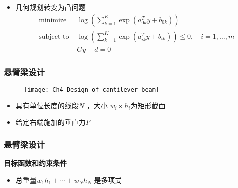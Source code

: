 \documentclass[handout]{beamer}
\begin{document}
\begin{frame}
\begin{frame}
\begin{itemize}[<+->]
			\item 几何规划转变为凸问题
			\begin{equation}
				\begin{array}{ll}
					\text { minimize } & \log \left(\sum_{k=1}^{K} \exp \left(a_{0 k}^{T} y+b_{0 k}\right)\right) \\
					\text { subject to } & \log \left(\sum_{k=1}^{K} \exp \left(a_{i k}^{T} y+b_{i k}\right)\right) \leq 0, \quad i=1, \ldots, m \\
					& G y+d=0
				\end{array}
			\end{equation}
		\end{itemize}
	\end{frame}
	\begin{frame}
		\frametitle{悬臂梁设计}
		\begin{figure}
			\centering
			\texttt{[image: Ch4-Design-of-cantilever-beam]}	
		\end{figure}
		\begin{itemize}%
			\item 具有单位长度的线段$N$ ，大小 $w_i \times h_i$为矩形截面
			\item 给定右端施加的垂直力$F$
		\end{itemize}
	\end{frame}
	\begin{frame}
		\frametitle{悬臂梁设计}
		\textbf{目标函数和约束条件}\\
		
		\begin{itemize}[<+->]
			\item 总重量$w_{1} h_{1}+\cdots+w_{N} h_{N}$ 是多项式
			

\end{itemize}
\end{frame}
\end{frame}
\end{document}
